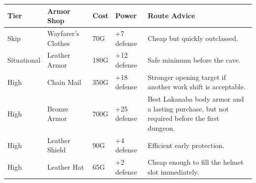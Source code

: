 \documentclass[
  american,
  10pt,
  letterpaper,
  oneside,
  open=any]{scrreprt}
\newcounter{none} %
\newenvironment{guidetable}{%
  \small\setstretch{1.0}%
  \setlength{\tabcolsep}{4pt}%
  \setlength{\LTpre}{8pt}\setlength{\LTpost}{10pt}%
  \renewcommand{\arraystretch}{1.16}%
}{ }
\begin{document}
\begin{guidetable}

{\def\LTcaptype{none} %
\begin{longtable}[]{@{}
  >{\raggedright\arraybackslash}p{}
  >{\raggedright\arraybackslash}p{}
  >{\raggedleft\arraybackslash}p{}
  >{\raggedleft\arraybackslash}p{}
  >{\raggedright\arraybackslash}p{}@{}}
\toprule\noalign{}
\begin{minipage}[b]{\linewidth}\raggedright
\color{GuideGreen}\bfseries Tier
\end{minipage} & \begin{minipage}[b]{\linewidth}\raggedright
\color{GuideGreen}\bfseries Armor Shop
\end{minipage} & \begin{minipage}[b]{\linewidth}\raggedleft
\color{GuideGreen}\bfseries Cost
\end{minipage} & \begin{minipage}[b]{\linewidth}\raggedleft
\color{GuideGreen}\bfseries Power
\end{minipage} & \begin{minipage}[b]{\linewidth}\raggedright
\color{GuideGreen}\bfseries Route Advice
\end{minipage} \\
\midrule\noalign{}
\endhead
\bottomrule\noalign{}
\endlastfoot
Skip & Wayfarer's Clothes & 70G & +7 defense & Cheap but quickly
outclassed. \\
Situational & Leather Armor & 180G & +12 defense & Safe minimum before
the cave. \\
High & Chain Mail & 350G & +18 defense & Stronger opening target if
another work shift is acceptable. \\
High & Bronze Armor & 700G & +25 defense & Best Lakanaba body armor and
a lasting purchase, but not required before the first dungeon. \\
High & Leather Shield & 90G & +4 defense & Efficient early
protection. \\
High & Leather Hat & 65G & +2 defense & Cheap enough to fill the helmet
slot immediately. \\
\end{longtable}
}

\end{guidetable}
\end{document}
